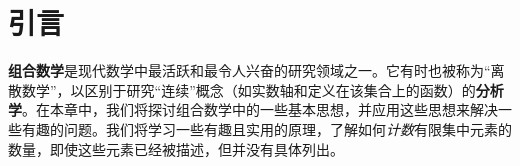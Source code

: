 \section{引言}

\textbf{组合数学}是现代数学中最活跃和最令人兴奋的研究领域之一。它有时也被称为``离散数学''，以区别于研究``连续''概念（如实数轴和定义在该集合上的函数）的\textbf{分析学}。在本章中，我们将探讨组合数学中的一些基本思想，并应用这些思想来解决一些有趣的问题。我们将学习一些有趣且实用的原理，了解如何\emph{计数}有限集中元素的数量，即使这些元素已经被描述，但并没有具体列出。







